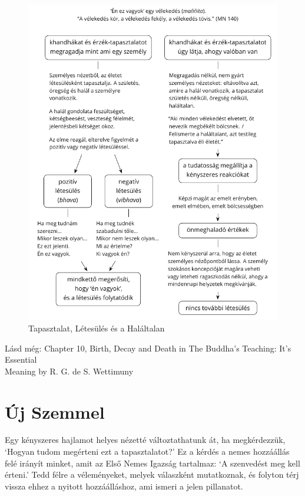 \begin{figure}[h]
\caption{Tapasztalat, Létesülés és a Haláltalan}\label{fig-experience-becoming-deathless}
\bigskip
\includegraphics[width=\linewidth-2mm]{./manuscript/tex/diagrams/experience-becoming-deathless-hu.pdf}
\end{figure}

{\noindent\footnotesize
Lásd még: Chapter 10, Birth, Decay and Death in The Buddha's Teaching: It's Essential\\ Meaning by R. G. de S. Wettimuny
\par}

\clearpage
\normalpagelayout

\section{Új Szemmel}


\noindent Egy kényszeres hajlamot helyes nézetté változtathatunk át, ha
megkérdezzük, `Hogyan tudom megérteni ezt a tapasztalatot?' Ez a kérdés
a nemes hozzáállás felé irányít minket, amit az Első Nemes Igazság
tartalmaz: `A szenvedést meg kell érteni.' Tedd félre a véleményeket,
melyek válaszként mutatkoznak, és folyton térj vissza ehhez a nyitott
hozzáálláshoz, ami ismeri a jelen pillanatot.

